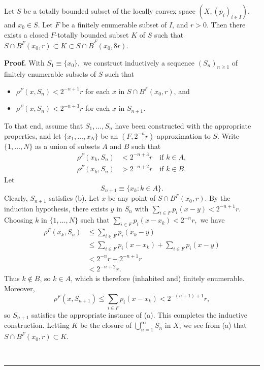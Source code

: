 \documentclass[10pt,a4paper]{amsart}
\newenvironment{proof}[1][Proof]{\noindent\textbf{#1.} }{\ \rule{0.5em}{0.5em}}
\begin{document}
\begin{proposition}
\label{p11}Let $S$ be a totally bounded subset of the locally convex space
$\left(  X,\left(  p_{i}\right)  _{i\in I}\right)  $, and $x_{0}\in S$. Let
$F$ be a finitely enumerable subset of $I$, and $r>0$. Then there exists a
closed $F$-totally bounded subset $K$ of $S$ such that $S\cap B^{F}%
(x_{0},r)\subset K\subset S\cap\overline{B}^{F}(x_{0},8r)$.
\end{proposition}

\begin{proof}
With $S_{1}\equiv\{x_{0}\},$ we construct inductively a sequence
$(S_{n})_{n\geqslant1}$ of finitely enumerable subsets of $S$ such that

\begin{itemize}
\item[(a)] $\rho^{F}(x,S_{n})<2^{-n+1}r$ for each $x$ in $S\cap B^{F}%
(x_{0},r)$, and

\item[(b)] \smallskip$\rho^{F}(x,S_{n})<2^{-n+3}r$ for each $x$ in $S_{n+1}.$
\end{itemize}

%

\noindent
To that end, assume that $S_{1},\ldots,S_{n}$ have been constructed with the
appropriate properties, and let $\{x_{1},\ldots,x_{N}\}$ be an $(F,2^{-n}%
r)$-approximation to $S.$ Write $\{1,\ldots,N\}$ as a union of subsets $A$ and
$B$ such that%
\begin{align*}
\rho^{F}(x_{k},S_{n})  &  <2^{-n+3}r\quad\mathrm{if}\,\,k\in A,\\
\rho^{F}(x_{k},S_{n})  &  >2^{-n+2}r\quad\mathrm{if}\,\,k\in B.
\end{align*}
Let%
\[
S_{n+1}\equiv\{x_{k}:k\in A\}.
\]
Clearly, $S_{n+1}$ satisfies (b). Let $x$ be any point of $S\cap B^{F}%
(x_{0},r).$ By the induction hypothesis, there exists $y$ in $S_{n}$ with
$\sum_{i\in F}p_{i}(x-y)<2^{-n+1}r.$ Choosing $k$ in $\{1,\ldots,N\}$ such
that $\sum_{i\in F}p_{i}(x-x_{k})<2^{-n}r,$ we have
\begin{align*}
\rho^{F}(x_{k},S_{n})  &  \leqslant\sum_{i\in F}p_{i}(x_{k}-y)\\
&  \leqslant\sum_{i\in F}p_{i}(x-x_{k})+\sum_{i\in F}p_{i}(x-y)\\
&  <2^{-n}r+2^{-n+1}r\\
&  <2^{-n+2}r.
\end{align*}
Thus $k\notin B$, so $k\in A$, which is therefore (inhabited and) finitely
enumerable. Moreover,
\[
\rho^{F}(x,S_{n+1})\leq\sum_{i\in F}p_{i}(x-x_{k})<2^{-(n+1)+1}r,
\]
so $S_{n+1}$ satisfies the appropriate instance of (a). This completes the
inductive construction. Letting $K$ be the closure of $\bigcup\limits_{n=1}%
^{\infty}S_{n}$ in $X$, we see from (a) that $S\cap B^{F}(x_{0},r)\subset K.$


\end{proof}
\end{document}

